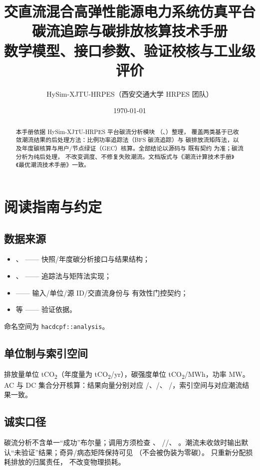 \documentclass[UTF8,fontset=fandol,a4paper,11pt]{ctexart}
\title{\textbf{交直流混合高弹性能源电力系统仿真平台}\\[0.5em]
       {\Large 碳流追踪与碳排放核算技术手册}\\[0.3em]
       {\large 数学模型、接口参数、验证校核与工业级评价}}
\author{HySim-XJTU-HRPES（西安交通大学 HRPES 团队）}
\date{\today}
\begin{document}
\maketitle
\begin{abstract}
\noindent 本手册依据 HySim-XJTU-HRPES 平台碳流分析模块
（、）整理，
覆盖两类基于已收敛潮流结果的后处理方法：比例功率追踪法（BFS 碳流追踪）与
碳排放流矩阵法，以及年度碳核算与用户/节点绿证（GEC）核算。全部结论以源码与
既有契约  为准；碳流分析为纯后处理，
不改变调度、不修复失败潮流。文档版式与《潮流计算技术手册》《最优潮流技术手册》一致。
\end{abstract}

\tableofcontents
\newpage

\section{阅读指南与约定}
\subsection{数据来源}
\begin{itemize}
  \item {}、
         —— 快照/年度碳分析接口与结果结构；
  \item {}、
         —— 追踪法与矩阵法实现；
  \item {} —— 输入/单位/源 ID/交直流身份与
        有效性门控契约；
  \item {} 等 —— 验证依据。
\end{itemize}
命名空间为 \texttt{hacdcpf::analysis}。

\subsection{单位制与索引空间}
排放量单位 tCO\textsubscript{2}（年度量为 tCO\textsubscript{2}/yr），碳强度单位
tCO\textsubscript{2}/MWh，功率 MW。AC 与 DC 集合分开核算：结果向量分别对应
/、/、
/，索引空间与对应潮流结果一致。

\subsection{诚实口径}
碳流分析不含单一“成功”布尔量；调用方须检查 、
//、
。潮流未收敛时输出默认“未验证”结果；奇异/病态矩阵保持可见
（不会被伪装为零碳）。 只重新分配损耗排放的归属责任，
不改变物理损耗。
\end{document}
